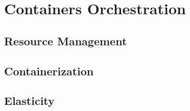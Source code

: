 \chapter{Containers Orchestration}
\label{chp:containers-orchestration}


\lipsum[1]


\section{Resource Management}
\label{sec:containers-orchestration-resource-management}

\lipsum[1]


\section{Containerization}
\label{sec:containers-orchestration-containerization}

\lipsum[1]


\section{Elasticity}
\label{sec:containers-orchestration-elasticity}

\lipsum[1]